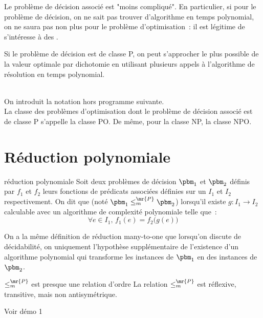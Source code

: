 \begin{adjustwidth}{-3cm}{-3cm}
Le problème de décision associé est "moins compliqué". En particulier, si pour le problème de décision, on ne sait pas trouver d'algorithme en temps polynomial, on ne saura pas non plus pour le problème d'optimisation~: il est légitime de s'intéresse à des .

\begin{remarque}{}{}
    Si le problème de décision est de classe P, on peut s'approcher le plus possible de la valeur optimale par dichotomie en utilisant plusieurs appels à l'algorithme de résolution en temps polynomial.
\end{remarque}
\\
On introduit la notation hors programme suivante.\\
La classe des problèmes d'optimisation dont le problème de décision associé est de classe P s'appelle la classe PO.
De même, pour la classe NP, la classe NPO.

\section{Réduction polynomiale}

\newcommand{\reductibleP}[]{\leq_m^\mr{P}}


\begin{definition}{}{réduction polynomiale}
    Soit deux problèmes de décision $\pbm_1$ et $\pbm_2$ définis par $f_1$ et $f_2$ leurs fonctions de prédicats associées définies sur un $I_1$ et $I_2$ respectivement. On dit que  (noté $\pbm_1 \reductibleP \pbm_2$) lorsqu'il existe $g:I_1 \to I_2$ calculable avec un algorithme de complexité polynomiale telle que~:
    $$\forall e \in I_1,\, f_1(e) = f_2\Big(g(e)\Big)$$
\end{definition}

\begin{remarque}{}{}
    On a la même définition de réduction many-to-one que lorsqu'on discute de décidabilité, on uniquement l'hypothèse supplémentaire de l'existence d'un algorithme polynomial qui transforme les instances de $\pbm_1$ en des instances de $\pbm_2$.
\end{remarque}

\begin{proposition}{}{$\reductibleP$ est presque une relation d'ordre}
    La relation $\reductibleP$ est réflexive, transitive, mais non antisymétrique.
\end{proposition}
Voir démo 1


\end{adjustwidth}
